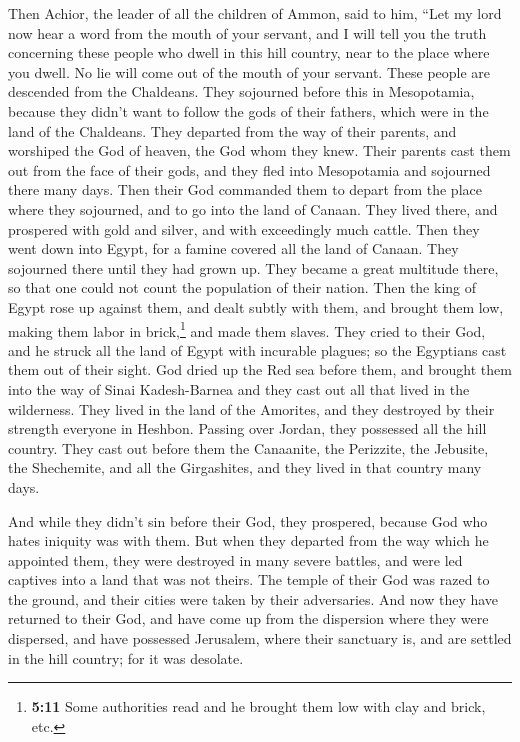  Then Achior, the leader of all the children of Ammon,
said to him, ``Let my lord now hear a word from the mouth of your
servant, and I will tell you the truth concerning these people who dwell
in this hill country, near to the place where you dwell. No lie will
come out of the mouth of your servant.  These people are
descended from the Chaldeans.  They sojourned before this
in Mesopotamia, because they didn't want to follow the gods of their
fathers, which were in the land of the Chaldeans.  They
departed from the way of their parents, and worshiped the God of heaven,
the God whom they knew. Their parents cast them out from the face of
their gods, and they fled into Mesopotamia and sojourned there many
days.  Then their God commanded them to depart from the
place where they sojourned, and to go into the land of Canaan. They
lived there, and prospered with gold and silver, and with exceedingly
much cattle.  Then they went down into Egypt, for a
famine covered all the land of Canaan. They sojourned there until they
had grown up. They became a great multitude there, so that one could not
count the population of their nation.  Then the king of
Egypt rose up against them, and dealt subtly with them, and brought them
low, making them labor in brick,\footnote{\textbf{5:11} Some authorities
  read and he brought them low with clay and brick, etc.} and made them
slaves.  They cried to their God, and he struck all the
land of Egypt with incurable plagues; so the Egyptians cast them out of
their sight.  God dried up the Red sea before them,
 and brought them into the way of Sinai Kadesh-Barnea and
they cast out all that lived in the wilderness.  They
lived in the land of the Amorites, and they destroyed by their strength
everyone in Heshbon. Passing over Jordan, they possessed all the hill
country.  They cast out before them the Canaanite, the
Perizzite, the Jebusite, the Shechemite, and all the Girgashites, and
they lived in that country many days.

 And while they didn't sin before their God, they
prospered, because God who hates iniquity was with them. 
But when they departed from the way which he appointed them, they were
destroyed in many severe battles, and were led captives into a land that
was not theirs. The temple of their God was razed to the ground, and
their cities were taken by their adversaries.  And now
they have returned to their God, and have come up from the dispersion
where they were dispersed, and have possessed Jerusalem, where their
sanctuary is, and are settled in the hill country; for it was desolate.

